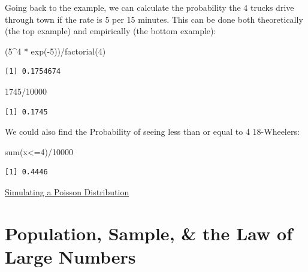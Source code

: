\documentclass[
  letterpaper,
  DIV=11,
  numbers=noendperiod]{scrreprt}
\newenvironment{Shaded}{\begin{snugshade}}{\end{snugshade}}
\newcommand{\DecValTok}[1]{\textcolor[rgb]{0.68,0.00,0.00}{#1}}
\newcommand{\FunctionTok}[1]{\textcolor[rgb]{0.28,0.35,0.67}{#1}}
\newcommand{\NormalTok}[1]{\textcolor[rgb]{0.00,0.23,0.31}{#1}}
\newcommand{\SpecialCharTok}[1]{\textcolor[rgb]{0.37,0.37,0.37}{#1}}
\begin{document}
Going back to the example, we can calculate the probability the 4 trucks
drive through town if the rate is 5 per 15 minutes. This can be done
both theoretically (the top example) and empirically (the bottom
example):

\begin{Shaded}
\begin{Highlighting}[]
\NormalTok{(}\DecValTok{5}\SpecialCharTok{\^{}}\DecValTok{4} \SpecialCharTok{*} \FunctionTok{exp}\NormalTok{(}\SpecialCharTok{{-}}\DecValTok{5}\NormalTok{))}\SpecialCharTok{/}\FunctionTok{factorial}\NormalTok{(}\DecValTok{4}\NormalTok{)}
\end{Highlighting}
\end{Shaded}

\begin{verbatim}
[1] 0.1754674
\end{verbatim}

\begin{Shaded}
\begin{Highlighting}[]
\DecValTok{1745}\SpecialCharTok{/}\DecValTok{10000}
\end{Highlighting}
\end{Shaded}

\begin{verbatim}
[1] 0.1745
\end{verbatim}

We could also find the Probability of seeing less than or equal to 4
18-Wheelers:

\begin{Shaded}
\begin{Highlighting}[]
\FunctionTok{sum}\NormalTok{(x}\SpecialCharTok{\textless{}=}\DecValTok{4}\NormalTok{)}\SpecialCharTok{/}\DecValTok{10000}
\end{Highlighting}
\end{Shaded}

\begin{verbatim}
[1] 0.4446
\end{verbatim}

\begin{watch}{}{}
    \href{https://youtu.be/RsaVDiUv5C0}{Simulating a Poisson Distribution}
\end{watch}

\section{Population, Sample, \& the Law of Large
Numbers}\label{population-sample-the-law-of-large-numbers}
\end{document}
